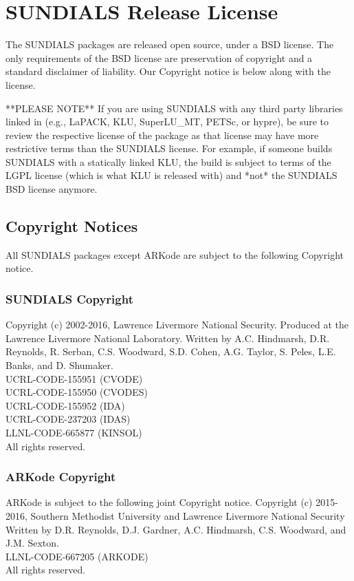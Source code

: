\section{SUNDIALS Release License}

The SUNDIALS packages are released open source, under a BSD license.
The only requirements of the BSD license are preservation of copyright and a standard disclaimer of liability.
Our Copyright notice is below along with the license.

**PLEASE NOTE**  If you are using SUNDIALS with any third 
party libraries linked in (e.g., LaPACK, KLU, SuperLU\_MT, PETSc, 
or hypre), be sure to review the respective license of the package as 
that license may have more restrictive terms than the SUNDIALS license.  
For example, if someone builds SUNDIALS with a statically linked KLU, 
the build is subject to terms of the LGPL license (which is what 
KLU is released with) and *not* the SUNDIALS BSD license anymore.

\subsection{Copyright Notices}
All SUNDIALS packages except ARKode are subject to the following Copyright
notice.

\subsubsection{SUNDIALS Copyright}
Copyright (c) 2002-2016, Lawrence Livermore National Security. 
Produced at the Lawrence Livermore National Laboratory.
Written by A.C. Hindmarsh, D.R. Reynolds, R. Serban, C.S. Woodward,
S.D. Cohen, A.G. Taylor, S. Peles, L.E. Banks, and D. Shumaker. \\
UCRL-CODE-155951    (CVODE)\\
UCRL-CODE-155950    (CVODES)\\
UCRL-CODE-155952    (IDA)\\
UCRL-CODE-237203    (IDAS)\\
LLNL-CODE-665877    (KINSOL)\\
All rights reserved. 
 
\subsubsection{ARKode Copyright}
ARKode is subject to the following joint Copyright notice.
Copyright (c) 2015-2016, Southern Methodist University and 
Lawrence Livermore National Security
Written by D.R. Reynolds, D.J. Gardner, A.C. Hindmarsh, C.S. Woodward,
and J.M. Sexton.\\
LLNL-CODE-667205    (ARKODE) \\
All rights reserved.


